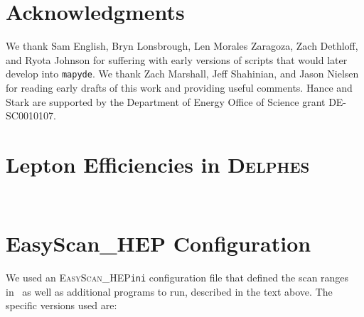 \documentclass{article}
\newcommand{\mapyde}{\texttt{mapyde}}
\newcommand{\delphes}{\textsc{Delphes}}
\newcommand{\easyscanhep}{\textsc{EasyScan\_HEP}}
\begin{document}
\section{Acknowledgments}
\label{sec:acknowledgments}

We thank Sam English, Bryn Lonsbrough, Len Morales Zaragoza, Zach Dethloff, and Ryota Johnson for suffering with early versions of scripts that would later develop into \mapyde.  We thank Zach Marshall, Jeff Shahinian, and Jason Nielsen for reading early drafts of this work and providing useful comments.  Hance and Stark are supported by the Department of Energy Office of Science grant DE-SC0010107.

\printbibliography

\appendix

\newpage

\section{Lepton Efficiencies in \delphes} \label{sec:lepton-efficiencies-in-delphes}
\begin{listing}[H]
	\inputminted[frame=single,framesep=2mm,firstline=476,lastline=503]{ini}{{auxdata/delphes_card_ATLAS_lowptleptons_sleptons_notrackineffic.tcl}}
	\caption{A snippet from the \mapyde-provided \delphes{} configuration for electron efficiencies. The portion that is commented out is what comes from the default ATLAS configuration. These numbers come from Ref.~\cite{ATLAS:2019lng}.}
	\label{lst:delphes-electron-efficiencies}
\end{listing}

\begin{listing}[H]
	\inputminted[frame=single,framesep=2mm,firstline=526,lastline=554]{ini}{{auxdata/delphes_card_ATLAS_lowptleptons_sleptons_notrackineffic.tcl}}
	\caption{A snippet from the \mapyde-provided \delphes{} configuration for muon efficiencies. The portion that is commented out is what comes from the default ATLAS configuration. These numbers come from Ref.~\cite{ATLAS:2019lng}.}
	\label{lst:delphes-muon-efficiencies}
\end{listing}


\section{EasyScan\_HEP Configuration}
\label{sec:easyscan-hep-configuration}

We used an \easyscanhep \texttt{ini} configuration file that defined the scan ranges in~ as well as additional programs to run, described in the text above. The specific versions used are:
\end{document}
